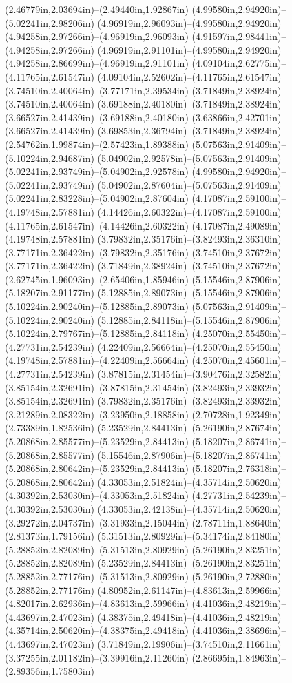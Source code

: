 (2.46779in,2.03694in)--(2.49440in,1.92867in) (4.99580in,2.94920in)--(5.02241in,2.98206in) (4.96919in,2.96093in)--(4.99580in,2.94920in) (4.94258in,2.97266in)--(4.96919in,2.96093in) (4.91597in,2.98441in)--(4.94258in,2.97266in) (4.96919in,2.91101in)--(4.99580in,2.94920in) (4.94258in,2.86699in)--(4.96919in,2.91101in) (4.09104in,2.62775in)--(4.11765in,2.61547in) (4.09104in,2.52602in)--(4.11765in,2.61547in) (3.74510in,2.40064in)--(3.77171in,2.39534in) (3.71849in,2.38924in)--(3.74510in,2.40064in) (3.69188in,2.40180in)--(3.71849in,2.38924in) (3.66527in,2.41439in)--(3.69188in,2.40180in) (3.63866in,2.42701in)--(3.66527in,2.41439in) (3.69853in,2.36794in)--(3.71849in,2.38924in) (2.54762in,1.99874in)--(2.57423in,1.89388in) (5.07563in,2.91409in)--(5.10224in,2.94687in) (5.04902in,2.92578in)--(5.07563in,2.91409in) (5.02241in,2.93749in)--(5.04902in,2.92578in) (4.99580in,2.94920in)--(5.02241in,2.93749in) (5.04902in,2.87604in)--(5.07563in,2.91409in) (5.02241in,2.83228in)--(5.04902in,2.87604in) (4.17087in,2.59100in)--(4.19748in,2.57881in) (4.14426in,2.60322in)--(4.17087in,2.59100in) (4.11765in,2.61547in)--(4.14426in,2.60322in) (4.17087in,2.49089in)--(4.19748in,2.57881in) (3.79832in,2.35176in)--(3.82493in,2.36310in) (3.77171in,2.36422in)--(3.79832in,2.35176in) (3.74510in,2.37672in)--(3.77171in,2.36422in) (3.71849in,2.38924in)--(3.74510in,2.37672in) (2.62745in,1.96093in)--(2.65406in,1.85946in) (5.15546in,2.87906in)--(5.18207in,2.91177in) (5.12885in,2.89073in)--(5.15546in,2.87906in) (5.10224in,2.90240in)--(5.12885in,2.89073in) (5.07563in,2.91409in)--(5.10224in,2.90240in) (5.12885in,2.84118in)--(5.15546in,2.87906in) (5.10224in,2.79767in)--(5.12885in,2.84118in) (4.25070in,2.55450in)--(4.27731in,2.54239in) (4.22409in,2.56664in)--(4.25070in,2.55450in) (4.19748in,2.57881in)--(4.22409in,2.56664in) (4.25070in,2.45601in)--(4.27731in,2.54239in) (3.87815in,2.31454in)--(3.90476in,2.32582in) (3.85154in,2.32691in)--(3.87815in,2.31454in) (3.82493in,2.33932in)--(3.85154in,2.32691in) (3.79832in,2.35176in)--(3.82493in,2.33932in) (3.21289in,2.08322in)--(3.23950in,2.18858in) (2.70728in,1.92349in)--(2.73389in,1.82536in) (5.23529in,2.84413in)--(5.26190in,2.87674in) (5.20868in,2.85577in)--(5.23529in,2.84413in) (5.18207in,2.86741in)--(5.20868in,2.85577in) (5.15546in,2.87906in)--(5.18207in,2.86741in) (5.20868in,2.80642in)--(5.23529in,2.84413in) (5.18207in,2.76318in)--(5.20868in,2.80642in) (4.33053in,2.51824in)--(4.35714in,2.50620in) (4.30392in,2.53030in)--(4.33053in,2.51824in) (4.27731in,2.54239in)--(4.30392in,2.53030in) (4.33053in,2.42138in)--(4.35714in,2.50620in) (3.29272in,2.04737in)--(3.31933in,2.15044in) (2.78711in,1.88640in)--(2.81373in,1.79156in) (5.31513in,2.80929in)--(5.34174in,2.84180in) (5.28852in,2.82089in)--(5.31513in,2.80929in) (5.26190in,2.83251in)--(5.28852in,2.82089in) (5.23529in,2.84413in)--(5.26190in,2.83251in) (5.28852in,2.77176in)--(5.31513in,2.80929in) (5.26190in,2.72880in)--(5.28852in,2.77176in) (4.80952in,2.61147in)--(4.83613in,2.59966in) (4.82017in,2.62936in)--(4.83613in,2.59966in) (4.41036in,2.48219in)--(4.43697in,2.47023in) (4.38375in,2.49418in)--(4.41036in,2.48219in) (4.35714in,2.50620in)--(4.38375in,2.49418in) (4.41036in,2.38696in)--(4.43697in,2.47023in) (3.71849in,2.19906in)--(3.74510in,2.11661in) (3.37255in,2.01182in)--(3.39916in,2.11260in) (2.86695in,1.84963in)--(2.89356in,1.75803in) 